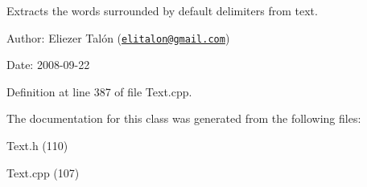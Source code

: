 Extracts the words surrounded by default delimiters from text. 

\begin{Desc}
\item[Author:]Eliezer Talón (\href{mailto:elitalon@gmail.com}{\tt elitalon@gmail.com}) \end{Desc}
\begin{Desc}
\item[Date:]2008-09-22 \end{Desc}


Definition at line 387 of file Text.cpp.

The documentation for this class was generated from the following files:\begin{CompactItemize}
\item 
Text.h (110)\item 
Text.cpp (107)\end{CompactItemize}
